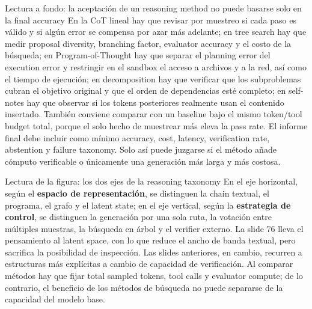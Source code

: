 \begin{knowledgebox}{Lectura a fondo: la aceptación de un reasoning method no puede basarse solo en la final accuracy}
En la CoT lineal hay que revisar por muestreo si cada paso es válido y si algún error se compensa por azar más adelante; en tree search hay que medir proposal diversity, branching factor, evaluator accuracy y el costo de la búsqueda; en Program-of-Thought hay que separar el planning error del execution error y restringir en el sandbox el acceso a archivos y a la red, así como el tiempo de ejecución; en decomposition hay que verificar que los subproblemas cubran el objetivo original y que el orden de dependencias esté completo; en self-notes hay que observar si los tokens posteriores realmente usan el contenido insertado. También conviene comparar con un baseline bajo el mismo token/tool budget total, porque el solo hecho de muestrear más eleva la pass rate. El informe final debe incluir como mínimo accuracy, cost, latency, verification rate, abstention y failure taxonomy. Solo así puede juzgarse si el método añade cómputo verificable o únicamente una generación más larga y más costosa.
\end{knowledgebox}



\begin{knowledgebox}{Lectura de la figura: los dos ejes de la reasoning taxonomy}
En el eje horizontal, según el \textbf{espacio de representación}, se distinguen la chain textual, el programa, el grafo y el latent state; en el eje vertical, según la \textbf{estrategia de control}, se distinguen la generación por una sola ruta, la votación entre múltiples muestras, la búsqueda en árbol y el verifier externo. La slide 76 lleva el pensamiento al latent space, con lo que reduce el ancho de banda textual, pero sacrifica la posibilidad de inspección. Las slides anteriores, en cambio, recurren a estructuras más explícitas a cambio de capacidad de verificación. Al comparar métodos hay que fijar total sampled tokens, tool calls y evaluator compute; de lo contrario, el beneficio de los métodos de búsqueda no puede separarse de la capacidad del modelo base.
\end{knowledgebox}

